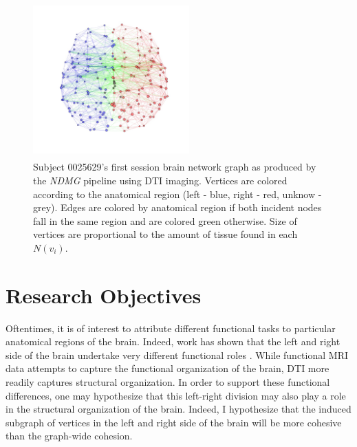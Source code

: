 \documentclass[01pt]{article}
\begin{document}
\begin{figure}
    \centering
    \includegraphics[height = 6cm, width = 6cm]{figures/Brain.jpeg}
    \caption{Subject 0025629's first session brain network graph as produced by the \textit{NDMG} pipeline using DTI imaging. Vertices are colored according to the anatomical region (left - blue, right - red, unknow - grey). Edges are colored by anatomical region if both incident nodes fall in the same region and are colored green otherwise. Size of vertices are proportional to the amount of tissue found in each $N(v_i)$.}
    \label{fig:brain}
\end{figure}

\section{Research Objectives}

Oftentimes, it is of interest to attribute different functional tasks to particular anatomical regions of the brain.
Indeed, work has shown that the left and right side of the brain undertake very different functional roles \cite{Corballis2014}. 
While functional MRI data attempts to capture the functional organization of the brain, DTI more readily captures structural organization. 
In order to support these functional differences, one may hypothesize that this left-right division may also play a role in the structural organization of the brain. 
Indeed, I hypothesize that the induced subgraph of vertices in the left and right side of the brain will be more cohesive than the graph-wide cohesion. 
\end{document}

